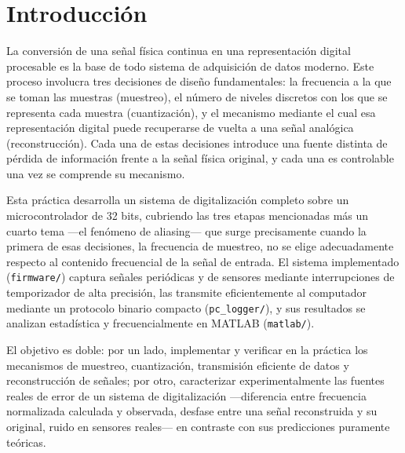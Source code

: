 
\section{Introducción}

La conversión de una señal física continua en una representación digital procesable es la base de todo sistema de adquisición de datos moderno. Este proceso involucra tres decisiones de diseño fundamentales: la frecuencia a la que se toman las muestras (muestreo), el número de niveles discretos con los que se representa cada muestra (cuantización), y el mecanismo mediante el cual esa representación digital puede recuperarse de vuelta a una señal analógica (reconstrucción). Cada una de estas decisiones introduce una fuente distinta de pérdida de información frente a la señal física original, y cada una es controlable una vez se comprende su mecanismo.

Esta práctica desarrolla un sistema de digitalización completo sobre un microcontrolador de 32 bits, cubriendo las tres etapas mencionadas más un cuarto tema —el fenómeno de aliasing— que surge precisamente cuando la primera de esas decisiones, la frecuencia de muestreo, no se elige adecuadamente respecto al contenido frecuencial de la señal de entrada. El sistema implementado (\texttt{firmware/}) captura señales periódicas y de sensores mediante interrupciones de temporizador de alta precisión, las transmite eficientemente al computador mediante un protocolo binario compacto (\texttt{pc\_logger/}), y sus resultados se analizan estadística y frecuencialmente en MATLAB (\texttt{matlab/}).

El objetivo es doble: por un lado, implementar y verificar en la práctica los mecanismos de muestreo, cuantización, transmisión eficiente de datos y reconstrucción de señales; por otro, caracterizar experimentalmente las fuentes reales de error de un sistema de digitalización —diferencia entre frecuencia normalizada calculada y observada, desfase entre una señal reconstruida y su original, ruido en sensores reales— en contraste con sus predicciones puramente teóricas.
